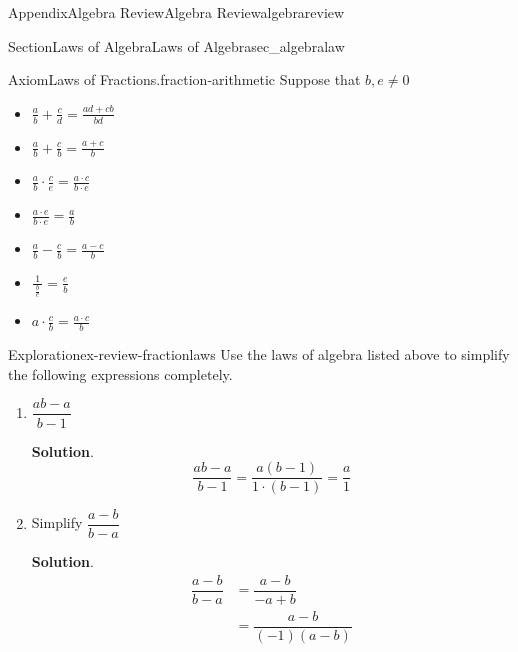 \documentclass[oneside,10pt,]{tufte-book}
\newcommand{\blocktitlefont}{\relax}
\numberwithin{equation}{chapter}
\newcommand{\amp}{&}
\begin{document}
\begin{appendixptx}{Appendix}{Algebra Review}{}{Algebra Review}{}{}{algebrareview}
\begin{sectionptx}{Section}{Laws of Algebra}{}{Laws of Algebra}{}{}{sec_algebralaw}
\begin{axiom}{Axiom}{Laws of Fractions.}{}{fraction-arithmetic}
Suppose that \(b,e\neq 0\)%
\begin{sidebyside}{2}{0.1}{0.1}{0}%
\begin{sbspanel}{0.4}%
%
\begin{itemize}[label=$\circ$]
\item{}\(\displaystyle \frac{a}{b} + \frac{c}{d} = \frac{ad + cb}{bd}\)%
\item{}\(\displaystyle \frac{a}{b} + \frac{c}{b}=  \frac{a+c}{b}\)%
\item{}\(\displaystyle \frac{a}{b} \cdot \frac{c}{e} =  \frac{a\cdot c}{b\cdot e}\)%
\item{} \(\displaystyle \frac{a\cdot e}{b\cdot e} = \frac{a}{b}\)%
\end{itemize}
\end{sbspanel}%
\begin{sbspanel}{0.4}%
%
\begin{itemize}[label=$\circ$]
\item{}\(\displaystyle \frac{a}{b} - \frac{c}{b} =  \frac{a-c}{b}\)%
\item{}\(\displaystyle \frac{1}{\ \frac{b}{e}\ }=  \frac{e}{b}\)%
\item{}\(\displaystyle a\cdot \frac{c}{b}=  \frac{a\cdot c}{b}\)%
\end{itemize}
\end{sbspanel}%
\end{sidebyside}%
\end{axiom}
\begin{exploration}{Exploration}{}{ex-review-fractionlaws}%
Use the laws of algebra listed above to simplify the following expressions completely.%
\begin{enumerate}[font=\bfseries,label=(\alph*),ref=\alph*]%
\item{}\(\dfrac{ab - a}{b-1}\)%
\par\smallskip%
\noindent\textbf{\blocktitlefont Solution}.\hypertarget{ex-review-fractionlaws-2-2}{}\quad{}%
\begin{equation*}
\dfrac{ab - a}{b-1} = \dfrac{a(b-1)}{1\cdot (b-1)} = \dfrac{a}{1}
\end{equation*}
%
\item{}Simplify \(\dfrac{a-b}{b-a}\)%
\par\smallskip%
\noindent\textbf{\blocktitlefont Solution}.\hypertarget{ex-review-fractionlaws-3-2}{}\quad{}%
\begin{align*}
\dfrac{a-b}{b-a} \amp = \dfrac{a-b}{-a + b }\\
\amp = \dfrac{a-b}{(-1) ( a - b)}\\

\end{align*}
\end{enumerate}
\end{exploration}
\end{sectionptx}
\end{appendixptx}
\end{document}
